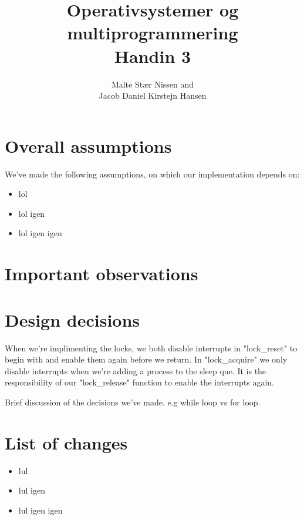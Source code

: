 \documentclass[11pt,a4paper]{article}
\title{Operativsystemer og multiprogrammering \\ Handin 3}
\author{Malte Stær Nissen and \\ 
        Jacob Daniel Kirstejn Hansen}
\begin{document}
\maketitle

\tableofcontents
\newpage

\section{Overall assumptions}
We've made the following assumptions, on which our implementation depends on: 

\begin{itemize}
\item lol
\item lol igen
\item lol igen igen
\end{itemize}

\section{Important observations}

\section{Design decisions}

When we're implimenting the locks, we both disable interrupts in "lock\_reset"
to begin with and enable them again before we return. In "lock\_acquire" we
only disable interrupts when we're adding a process to the sleep que. It is the
responsibility of our "lock\_release" function to enable the interrupts again.

Brief discussion of the decisions we've made. e.g while loop vs for loop.

\section{List of changes}

\begin{itemize}
\item lul
\item lul igen
\item lul igen igen
\end{itemize}
\end{document}
